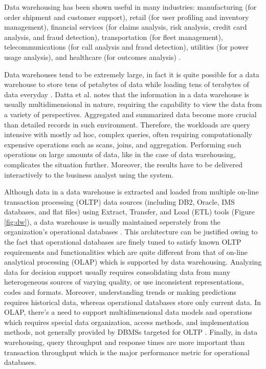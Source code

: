 \documentclass[12pt,a4paper]{article}
\begin{document}
Data warehousing has been shown useful in many industries: manufacturing (for order shipment and customer support), retail (for user profiling and inventory
management), financial services (for claims analysis, risk analysis, credit card analysis, and fraud detection), transportation (for fleet management),
telecommunications (for call analysis and fraud detection), utilities (for power usage analysis), and healthcare (for outcomes analysis)
\cite{chaudhuri1997overview}.

Data warehouses tend to be extremely large, in fact it is quite possible for a data warehouse to store tens of petabytes of data while loading tens of terabytes
of data everyday \cite{thusoo2010data}. Datta et al. \cite {datta2002parallel} notes that the information in a data warehouse is usually multidimensional in
nature, requiring the capability to view the data from a variety of perspectives. Aggregated and summarized data become more crucial than detailed records in
such environment. Therefore, the workloads are query intensive with mostly ad hoc, complex queries, often requiring computationally expensive operations such as
scans, joins, and aggregation. Performing such operations on large amounts of data, like in the case of data warehousing, complicates the situation further.
Moreover, the results have to be delivered interactively to the business analyst using the system.

Although data in a data warehouse is extracted and loaded from multiple on-line transaction processing (OLTP) data sources (including DB2, Oracle, IMS
databases, and flat files) using Extract, Transfer, and Load (ETL) tools (Figure \ref{fig:dw}), a data warehouse is usually maintained seperately from the
organization's operational databases \cite{sen2005comparison, chaudhuri1997overview}. This architecture can be justified owing to the fact that operational
databases are finely tuned to satisfy known OLTP requirements and functionalities which are quite different from that of on-line analytical processing (OLAP)
which is supported by data warehousing. Analyzing data for decision support usually requires consolidating data from many heterogeneous sources of varying
quality, or use inconsistent representations, codes and formats. Moreover, understanding trends or making predictions requires historical data, whereas
operational databases store only current data. In OLAP, there's a need to support multidimensional data models and operations which requires special data
organization, access methods, and implementation methods, not generally provided by DBMSs targeted for OLTP \cite{chaudhuri1997overview}. Finally, in data
warehousing, query throughput and response times are more important than transaction throughput which is the major performance metric for operational databases.
\end{document}
